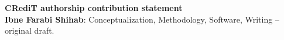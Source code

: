 \documentclass[preprint,review,12pt]{elsarticle} %
\begin{document}
\vspace{1em}
\noindent\textbf{CRediT authorship contribution statement}\\
\textbf{Ibne Farabi Shihab}: Conceptualization, Methodology, Software, Writing -- original draft.

\vspace{0.5em}



\end{document}
